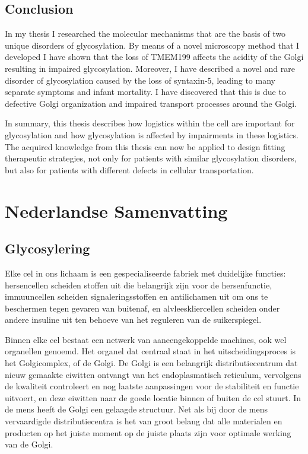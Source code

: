 \subsection{Conclusion}

In my thesis I researched the molecular mechanisms that are the basis of two unique disorders of glycosylation. By means of a novel microscopy method that I developed I have shown that the loss of TMEM199 affects the acidity of the Golgi resulting in impaired glycosylation. Moreover, I have described a novel and rare disorder of glycosylation caused by the loss of syntaxin-5, leading to many separate symptoms and infant mortality. I have discovered that this is due to defective Golgi organization and impaired transport processes around the Golgi.

In summary, this thesis describes how logistics within the cell are important for glycosylation and how glycosylation is affected by impairments in these logistics. The acquired knowledge from this thesis can now be applied to design fitting therapeutic strategies, not only for patients with similar glycosylation disorders, but also for patients with different defects in cellular transportation.

\cleartoleftpage

\section{Nederlandse Samenvatting}

\subsection{Glycosylering}

Elke cel in ons lichaam is een gespecialiseerde fabriek met duidelijke functies: hersencellen scheiden stoffen uit die belangrijk zijn voor de hersenfunctie, immuuncellen scheiden signaleringsstoffen en antilichamen uit om ons te beschermen tegen gevaren van buitenaf, en alvleeskliercellen scheiden onder andere insuline uit ten behoeve van het reguleren van de suikerspiegel.

Binnen elke cel bestaat een netwerk van aaneengekoppelde machines, ook wel organellen genoemd. Het organel dat centraal staat in het uitscheidingsproces is het Golgicomplex, of de Golgi. De Golgi is een belangrijk distributiecentrum dat nieuw gemaakte eiwitten ontvangt van het endoplasmatisch reticulum, vervolgens de kwaliteit controleert en nog laatste aanpassingen voor de stabiliteit en functie uitvoert, en deze eiwitten naar de goede locatie binnen of buiten de cel stuurt. In de mens heeft de Golgi een gelaagde structuur. Net als bij door de mens vervaardigde distributiecentra is het van groot belang dat alle materialen en producten op het juiste moment op de juiste plaats zijn voor optimale werking van de Golgi.

